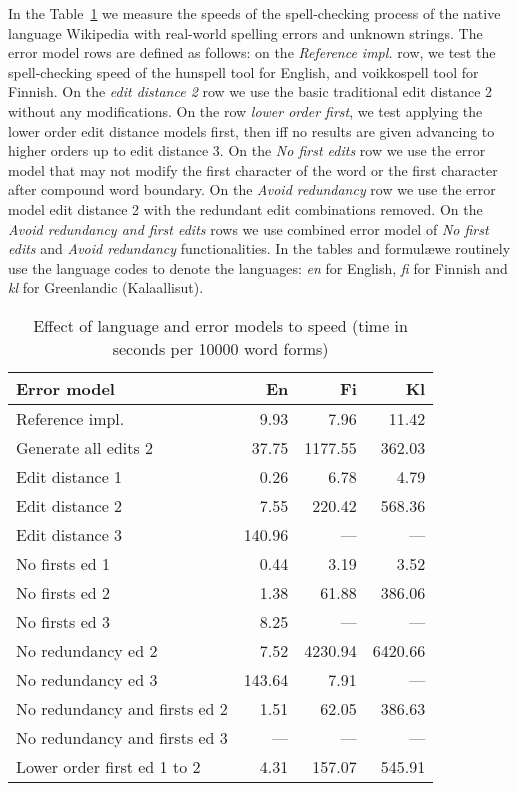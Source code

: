 \documentclass[11pt]{article}
\begin{document}
In the Table~\ref{table:error-model-vs-language-speed} we measure the speeds of
the spell-checking process of the native language Wikipedia with real-world
spelling errors and unknown strings. The error model rows are defined as
follows: on the \emph{Reference impl.} row, we test the spell-checking speed of
the hunspell tool for English, and voikkospell tool for Finnish. On the
\emph{edit distance 2} row we use the basic traditional edit distance 2 without
any modifications. On the row \emph{lower order first}, we test applying the
lower order edit distance models first, then iff no results are given advancing
to higher orders up to edit distance 3. On the \emph{No first edits} row we
use the error model that may not modify the first character of the word or the
first character after compound word boundary. On the \emph{Avoid redundancy}
row we use the error model edit distance 2 with the redundant edit combinations
removed. On the \emph{Avoid redundancy and first edits} rows we use combined
error model of \emph{No first edits} and \emph{Avoid redundancy}
functionalities.  In the tables and formul\ae we routinely use the language
codes to denote the languages: \emph{en} for English, \emph{fi} for Finnish and
\emph{kl} for Greenlandic (Kalaallisut). 

\begin{table}[h]
\begin{center}
\begin{scriptsize}
\begin{tabular}{|l|rrr|}
\hline
\bf Error model & \bf En & \bf Fi & \bf Kl \\ 
\hline
Reference impl. &
9.93&7.96&11.42
\\
Generate all edits 2 & 
37.75&1177.55&362.03
\\
\hline
Edit distance 1 &
0.26&6.78&4.79
\\
Edit distance 2 &
7.55&220.42&568.36
\\
Edit distance 3 &
140.96&---&---
\\
No firsts ed 1 & 
0.44&3.19&3.52
\\
No firsts ed 2 &
1.38&61.88&386.06
\\
No firsts ed 3 &
8.25&---&---
\\
No redundancy ed 2 &
7.52&4230.94&6420.66
\\
No redundancy ed 3 &
143.64&7.91&---
\\
No redundancy and firsts ed 2 &
1.51&62.05&386.63
\\
No redundancy and firsts ed 3 &
---&---&---
\\
Lower order first ed 1 to 2 &
4.31&157.07&545.91
\\
\end{tabular}
\end{scriptsize}
\end{center}
\caption{\label{table:error-model-vs-language-speed} Effect of language and 
error models to speed (time in seconds per 10000 word forms)}
\end{table}
\end{document}
